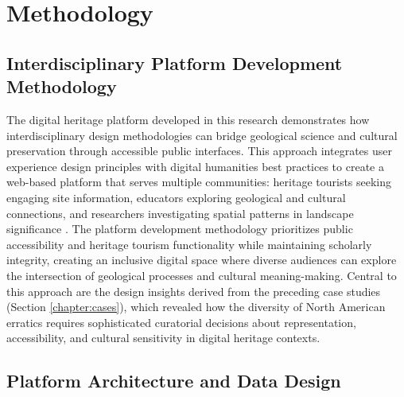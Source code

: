 \chapter{Methodology}
\label{chapter:method}

\section{Interdisciplinary Platform Development Methodology}
\label{sec:methodology_overview}

The digital heritage platform developed in this research demonstrates how interdisciplinary design methodologies can bridge geological science and cultural preservation through accessible public interfaces. This approach integrates user experience design principles with digital humanities best practices to create a web-based platform that serves multiple communities: heritage tourists seeking engaging site information, educators exploring geological and cultural connections, and researchers investigating spatial patterns in landscape significance \cite{Gregory2013, Bodenhamer2010}. The platform development methodology prioritizes public accessibility and heritage tourism functionality while maintaining scholarly integrity, creating an inclusive digital space where diverse audiences can explore the intersection of geological processes and cultural meaning-making. Central to this approach are the design insights derived from the preceding case studies (Section \ref{chapter:cases}), which revealed how the diversity of North American erratics requires sophisticated curatorial decisions about representation, accessibility, and cultural sensitivity in digital heritage contexts.

\section{Platform Architecture and Data Design}
\label{sec:platform_architecture}

